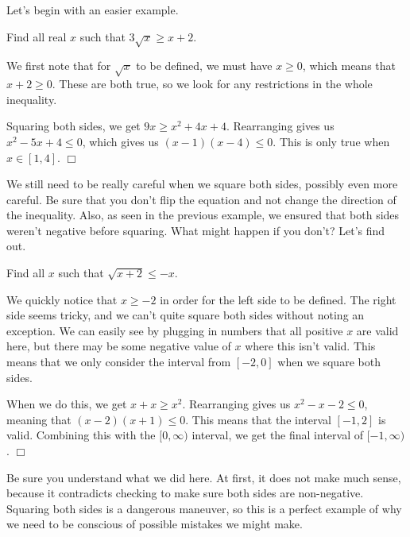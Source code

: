 \documentclass[lang=en,11pt]{elegantbook}
\begin{document}
Let's begin with an easier example.
\begin{example}
Find all real $x$ such that $3\sqrt{x}\geq x+2$.
\end{example}
\begin{solution}
We first note that for $\sqrt{x}$ to be defined, we must have $x\geq 0$, which means that $x+2\geq 0$. These are both true, so we look for any restrictions in the whole inequality.

Squaring both sides, we get $9x\geq x^2+4x+4$.  Rearranging gives us $x^2-5x+4\leq 0$, which gives us $(x-1)(x-4)\leq 0$.  This is only true when $x\in[1,4]$. $\Box$
\end{solution}
We still need to be really careful when we square both sides, possibly even more careful.  Be sure that you don't flip the equation and not change the direction of the inequality.  Also, as seen in the previous example, we ensured that both sides weren't negative before squaring. What might happen if you don't? Let's find out.
\begin{example}
Find all $x$ such that $\sqrt{x+2}\leq -x$.
\end{example}
\begin{solution}
We quickly notice that $x\geq -2$ in order for the left side to be defined.  The right side seems tricky, and we can't quite square both sides without noting an exception.  We can easily see by plugging in numbers that all positive $x$ are valid here, but there may be some negative value of $x$ where this isn't valid.  This means that we only consider the interval from $[-2,0]$ when we square both sides.

When we do this, we get $x+x\geq x^2$. Rearranging gives us $x^2-x-2\leq 0$, meaning that $(x-2)(x+1)\leq 0$.  This means that the interval $[-1,2]$ is valid.  Combining this with the $[0,\infty)$ interval, we get the final interval of $[-1,\infty)$. $\Box$
\end{solution}
Be sure you understand what we did here.  At first, it does not make much sense, because it contradicts checking to make sure both sides are non-negative.  Squaring both sides is a dangerous maneuver, so this is a perfect example of why we need to be conscious of possible mistakes we might make.
\end{document}
